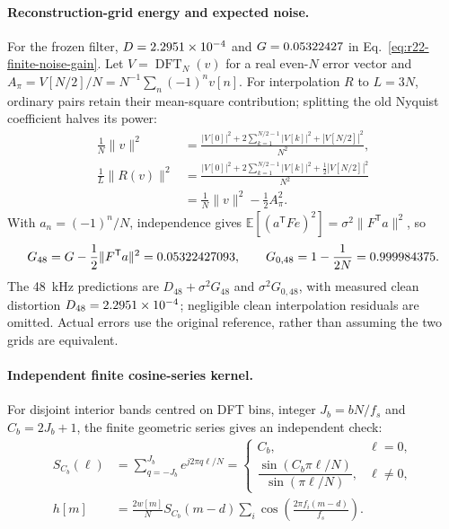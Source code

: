 \paragraph{Reconstruction-grid energy and expected noise.}
For the frozen filter, $D=2.2951\times10^{-4}$ and $G=0.05322427$ in
Eq.~\eqref{eq:r22-finite-noise-gain}. Let $V=\operatorname{DFT}_N(v)$ for
a real even-$N$ error vector and $A_\pi=V[N/2]/N=N^{-1}\sum_n(-1)^nv[n]$.
For interpolation $R$ to $L=3N$, ordinary pairs retain their mean-square
contribution; splitting the old Nyquist coefficient halves its power:
\begin{align}
 \frac1N\|v\|^2
 &=\frac{|V[0]|^2+
 2\sum_{k=1}^{N/2-1}|V[k]|^2+|V[N/2]|^2}{N^2},\nonumber\\
 \frac1L\|R(v)\|^2
 &=\frac{|V[0]|^2+
 2\sum_{k=1}^{N/2-1}|V[k]|^2+\tfrac12|V[N/2]|^2}{N^2}\nonumber\\
 &=\frac1N\|v\|^2-\frac12 A_\pi^2.
 \label{eq:r23-reconstruction-energy}
\end{align}
With $a_n=(-1)^n/N$, independence gives
$\mathbb E[(a^{\mathsf T}Fe)^2]=\sigma^2\|F^{\mathsf T}a\|^2$, so
\begin{equation}
 G_{48}=G-\frac12\|F^\mathsf{T}a\|^2
       =0.05322427093,\qquad
 G_{0,48}=1-\frac1{2N}=0.999984375.
 \label{eq:r23-high-gain}
\end{equation}
The 48~kHz predictions are $D_{48}+\sigma^2G_{48}$ and
$\sigma^2G_{0,48}$, with measured clean distortion $D_{48}=2.2951\times10^{-4}$;
negligible clean interpolation residuals are omitted. Actual errors use
the original reference, rather than assuming the two grids are equivalent.

\paragraph{Independent finite cosine-series kernel.}
For disjoint interior bands centred on DFT bins, integer $J_b=bN/f_s$
and $C_b=2J_b+1$, the finite geometric series gives an independent check:
\begin{align}
 S_{C_b}(\ell)
 &=\sum_{q=-J_b}^{J_b}e^{j2\pi q\ell/N}
 =\begin{cases}
 C_b,&\ell=0,\\
 \dfrac{\sin(C_b\pi\ell/N)}{\sin(\pi\ell/N)},&\ell\ne0,
 \end{cases}\nonumber\\
 h[m]&=\frac{2w[m]}{N}S_{C_b}(m-d)
       \sum_i\cos\!\left(\frac{2\pi f_i(m-d)}{f_s}\right).
 \label{eq:r23-audit-kernel}
\end{align}

